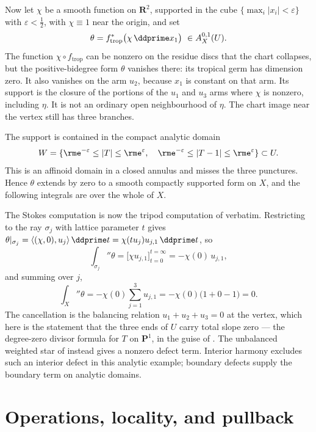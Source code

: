 \begin{example}
Now let $\chi$ be a smooth function on $\mathbf R^2$, supported in the
cube $\{\max_i|x_i|<\varepsilon\}$ with $\varepsilon<\tfrac12$, with
$\chi\equiv1$ near the origin, and set
\[
 \theta=f_{\mathrm{trop}}^*\bigl(\chi\,\ddprime x_1\bigr)
 \ \in A^{0,1}_{X}(U).
\]
The function $\chi\circ f_{\mathrm{trop}}$ can be nonzero on the residue
discs that the chart collapses, but the positive-bidegree form $\theta$
vanishes there: its tropical germ has dimension zero.  It also vanishes
on the arm $u_2$, because $x_1$ is constant on that arm.  Its support is
the closure of the portions of the $u_1$ and $u_3$ arms where $\chi$ is
nonzero, including $\eta$.  It is not an ordinary open neighbourhood of
$\eta$.  The chart image near the vertex still has three branches.

The support is contained in the compact analytic domain
\[
 W=\{\rme^{-\varepsilon}\le|T|\le\rme^{\varepsilon},\quad
       \rme^{-\varepsilon}\le|T-1|\le\rme^{\varepsilon}\}\subset U.
\]
This is an affinoid domain in a closed annulus and misses the three
punctures.  Hence $\theta$ extends by zero to a smooth compactly supported
form on $X$, and the following integrals are over the whole of $X$.

The Stokes computation is now the tripod computation of
 verbatim.  Restricting to the ray $\sigma_j$
with lattice parameter $t$ gives
$\theta|_{\sigma_j}=\langle(\chi,0),u_j\rangle\,\ddprime t
=\chi(tu_j)u_{j,1}\,\ddprime t$, so
\[
 \int_{\sigma_j}\dprime\theta
 =\bigl[\chi u_{j,1}\bigr]_{t=0}^{t=\infty}
 =-\chi(0)\,u_{j,1},
\]
and summing over $j$,
\[
 \int_X\dprime\theta
 =-\chi(0)\sum_{j=1}^3u_{j,1}
 =-\chi(0)\bigl(1+0-1\bigr)=0 .
\]
The cancellation is the balancing relation $u_1+u_2+u_3=0$ at the vertex,
which here is the statement that the three ends of $U$ carry total slope
zero --- the degree-zero divisor formula for $T$ on $\mathbf P^1$, in the
guise of .  The unbalanced weighted
star of  instead gives a nonzero defect
term.  Interior harmony excludes such an interior defect in this analytic
example; boundary defects supply the boundary term on analytic domains.
\end{example}

\section{Operations, locality, and pullback}
\label{sec:ch13-operations}

